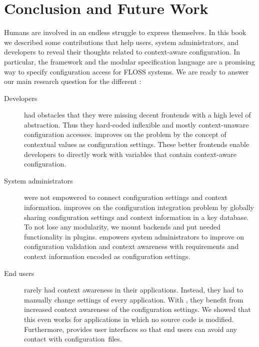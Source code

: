 \chapter{Conclusion and Future Work}
\label{chapter:conclusion}

\chapterhung

Humans are involved in an endless struggle to express themselves.
In this book we described some contributions that help users, system administrators, and developers to reveal their thoughts related to context-aware configuration.
In particular, the framework \elektra{} and the modular specification language  are a promising way to specify configuration access for FLOSS systems.
We are ready to answer our main research question for the different :
\rqMain*


\begin{description}
\item[Developers] had obstacles that they were missing decent frontends with a high level of abstraction.
Thus they hard-coded inflexible and mostly context-unaware configuration accesses.
\elektra{} improves on the problem by the concept of contextual values as configuration settings.
These better frontends enable developers to directly work with variables that contain context-aware configuration.

\item[System administrators] were not empowered to connect configuration settings and context information.
\elektra{} improves on the configuration integration problem by globally sharing configuration settings and context information in a key database.
To not lose any modularity, we mount backends and put needed functionality in plugins.
 empowers system administrators to improve on configuration validation and context awareness with requirements and context information encoded as configuration settings.

\item[End users] rarely had context awareness in their applications.
Instead, they had to manually change settings of every application.
With \elektra{}, they benefit from increased context awareness of the configuration settings.
We showed that this even works for applications in which no source code is modified.
Furthermore, \elektra{} provides user interfaces so that end users can avoid any contact with configuration~files.
\end{description}



